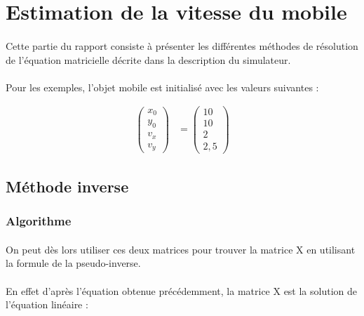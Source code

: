 \documentclass[a4paper,11pt]{article}
\begin{document}
	\newpage

	\section{Estimation de la vitesse du mobile}
		
		\paragraph{}
		Cette partie du rapport consiste à présenter les différentes méthodes de résolution de l'équation matricielle décrite dans la description du simulateur.

		\paragraph{}
		Pour les exemples, l'objet mobile est initialisé avec les valeurs suivantes :

		\begin{align}
			\begin{pmatrix}
			    x_0 \\
			    y_0 \\
			    v_x \\
			    v_y  
			\end{pmatrix}
			&=
			\begin{pmatrix}
			    10 \\
			    10 \\
			    2 \\
			    2,5
			\end{pmatrix}
		\end{align}

		\subsection{Méthode inverse}

			\subsubsection{Algorithme}

			\paragraph{}
			On peut dès lors utiliser ces deux matrices pour trouver la matrice X en utilisant la formule de la pseudo-inverse.

			\paragraph{}
			En effet d'après l'équation obtenue précédemment, la matrice X est la solution de l'équation linéaire :
\end{document}
